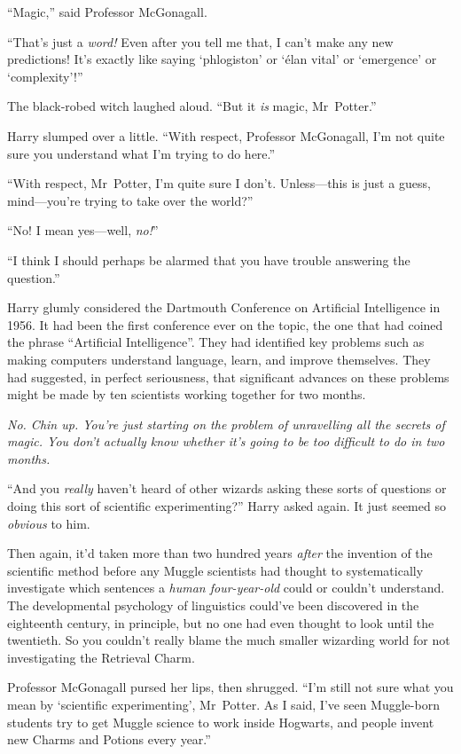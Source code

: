 “Magic,” said Professor McGonagall.

“That’s just a \emph{word!} Even after you tell me that, I can’t make any new predictions! It’s exactly like saying ‘phlogiston’ or ‘élan vital’ or ‘emergence’ or ‘complexity’!”

The black-robed witch laughed aloud. “But it \emph{is} magic, Mr~Potter.”

Harry slumped over a little. “With respect, Professor McGonagall, I’m not quite sure you understand what I’m trying to do here.”

“With respect, Mr~Potter, I’m quite sure I don’t. Unless—this is just a guess, mind—you’re trying to take over the world?”

“No! I mean yes—well, \emph{no!}”

“I think I should perhaps be alarmed that you have trouble answering the question.”

Harry glumly considered the Dartmouth Conference on Artificial Intelligence in 1956. It had been the first conference ever on the topic, the one that had coined the phrase “Artificial Intelligence”. They had identified key problems such as making computers understand language, learn, and improve themselves. They had suggested, in perfect seriousness, that significant advances on these problems might be made by ten scientists working together for two months.

\emph{No. Chin up. You’re just \emph{starting} on the problem of unravelling all the secrets of magic. You don’t actually \emph{know} whether it’s going to be too difficult to do in two months.}

“And you \emph{really} haven’t heard of other wizards asking these sorts of questions or doing this sort of scientific experimenting?” Harry asked again. It just seemed so \emph{obvious} to him.

Then again, it’d taken more than two hundred years \emph{after} the invention of the scientific method before any Muggle scientists had thought to systematically investigate which sentences a \emph{human four-year-old} could or couldn’t understand. The developmental psychology of linguistics could’ve been discovered in the eighteenth century, in principle, but no one had even thought to look until the twentieth. So you couldn’t really blame the much smaller wizarding world for not investigating the Retrieval Charm.

Professor McGonagall pursed her lips, then shrugged. “I’m still not sure what you mean by ‘scientific experimenting’, Mr~Potter. As I said, I’ve seen Muggle-born students try to get Muggle science to work inside Hogwarts, and people invent new Charms and Potions every year.”

